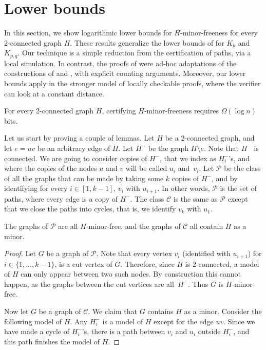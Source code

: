 \documentclass[a4paper,thm-restate,USenglish]{lipics-v2019}
\newcommand{\Hm}{H^{-}}
\begin{document}
\section{Lower bounds}
\label{sec:lower-bound}

In this section, we show logarithmic lower bounds for $H$-minor-freeness for every 2-connected graph $H$. 
These results generalize the lower bounds of \cite{FeuilloleyFMRRT20} for $K_k$ and $K_{p,q}$. Our technique is a simple reduction from the certification of paths, via a local simulation. 
In contrast, the proofs of \cite{FeuilloleyFMRRT20} were ad-hoc adaptations of the constructions of \cite{GoosS16} and \cite{FeuilloleyH18}, with explicit counting arguments.
Moreover, our lower bounds apply in the stronger model of locally checkable proofs, where the verifier can look at a constant distance. 

\begin{theorem}
\label{thm:lower-bound}
For every 2-connected graph $H$, certifying $H$-minor-freeness requires $\Omega(\log n)$ bits.
\end{theorem}

Let us start by proving a couple of lemmas. 
Let $H$ be a 2-connected graph, and let $e=uv$ be an arbitrary edge of $H$. 
Let $\Hm$ be the graph $H \setminus e$. Note that $H^{-}$ is connected.
We are going to consider copies of $\Hm$, that we  index as $\Hm_i$'s, and where the copies of the nodes $u$ and $v$ will be called $u_i$ and~$v_i$.
Let $\mathcal{P}$ be the class of all the graphs that can be made by taking some $k$ copies of $\Hm$, and by identifying for every $i\in [1,k-1]$, $v_i$ with $u_{i+1}$. 
In other words, $\mathcal{P}$ is the set of paths, where every edge is a copy of $\Hm$.
The class $\mathcal{C}$ is the same as $\mathcal{P}$ except that we close the paths into cycles, that is, we identify $v_k$ with $u_1$.

\begin{lemma}
\label{lem:P-C}
The graphs of $\mathcal{P}$ are all $H$-minor-free, and the graphs of $\mathcal{C}$ all contain $H$ as a minor.
\end{lemma}

\begin{proof}
Let $G$ be a graph of $\mathcal{P}$. Note that every vertex $v_i$ (identified with $u_{i+1}$) for $i\in \{1,...,k-1\}$, is a cut vertex of $G$. Therefore, since $H$ is 2-connected, a model of $H$ can only appear between two such nodes. 
By construction this cannot happen, as the graphs between the cut vertices are all~$\Hm$.
Thus $G$ is $H$-minor-free.

Now let $G$ be a graph of $\mathcal{C}$. We claim that $G$ contains $H$ as a minor. Consider the following model of $H$. Any $\Hm_i$ is a model of $H$ except for the edge $uv$. Since we have made a cycle of $\Hm_i$'s, there is a path between $v_i$ and $u_i$ outside $\Hm_i$, and this path finishes the model of $H$.
\end{proof}
\end{document}
